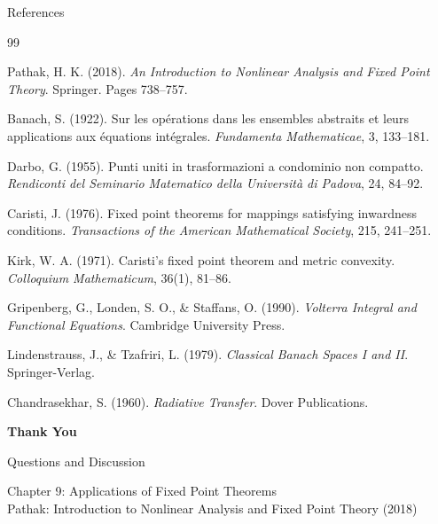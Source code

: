 \documentclass[aspectratio=169,10pt]{beamer}
\begin{document}
\begin{frame}[allowframebreaks]{References}
\small
\begin{thebibliography}{99}

 Pathak, H. K. (2018). \textit{An Introduction to Nonlinear Analysis and Fixed Point Theory}. Springer. Pages 738--757.

 Banach, S. (1922). Sur les opérations dans les ensembles abstraits et leurs applications aux équations intégrales. \textit{Fundamenta Mathematicae}, 3, 133--181.

 Darbo, G. (1955). Punti uniti in trasformazioni a condominio non compatto. \textit{Rendiconti del Seminario Matematico della Università di Padova}, 24, 84--92.

 Caristi, J. (1976). Fixed point theorems for mappings satisfying inwardness conditions. \textit{Transactions of the American Mathematical Society}, 215, 241--251.

 Kirk, W. A. (1971). Caristi's fixed point theorem and metric convexity. \textit{Colloquium Mathematicum}, 36(1), 81--86.

 Gripenberg, G., Londen, S. O., \& Staffans, O. (1990). \textit{Volterra Integral and Functional Equations}. Cambridge University Press.

 Lindenstrauss, J., \& Tzafriri, L. (1979). \textit{Classical Banach Spaces I and II}. Springer-Verlag.

 Chandrasekhar, S. (1960). \textit{Radiative Transfer}. Dover Publications.

\end{thebibliography}
\end{frame}

\begin{frame}{}
\begin{center}
\Large
\textbf{Thank You}

\vspace{1.5cm}

Questions and Discussion

\vspace{1.5cm}

\small
Chapter 9: Applications of Fixed Point Theorems\\
Pathak: Introduction to Nonlinear Analysis and Fixed Point Theory (2018)
\end{center}
\end{frame}
\end{document}
